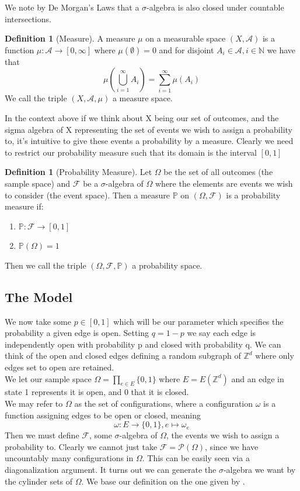\documentclass[a4paper,11pt]{article}
\theoremstyle{definition}
\newtheorem{definition}[theorem]{Definition}
\newcommand{\ints}{\mathbb{Z}}
\newcommand{\sigalg}{$\sigma$-algebra }
\begin{document}
We note by De Morgan's Laws that a $\sigma$-algebra is also closed under countable intersections.

\begin{definition}[Measure]
	A measure $\mu$ on a measurable space $(X,\mathcal{A})$ is a function $\mu: \mathcal{A} \rightarrow [0,\infty]$ where 
	$\mu(\emptyset) = 0 $ and for disjoint $A_i \in \mathcal{A}, i \in \mathbb{N}$ we have that
	$$ \mu(\bigcup^\infty_{i=1} A_i) = \sum_{i = 1}^{\infty} \mu(A_i)  $$
	We call the triple $(X,\mathcal{A},\mu)$ a measure space.
\end{definition}

In the context above if we think about X being our set of outcomes, and the sigma algebra of X representing the set of events we wish to assign a probability to, it's intuitive to give these events a probability by a measure. 
Clearly we need to restrict our probability measure such that its domain is the interval $[0,1]$ 

\begin{definition}[Probability Measure]
	Let $\Omega$ be the set of all outcomes (the sample space) and $\mathcal{F}$ be a \sigalg of $\Omega$ where the elements are events we wish to consider (the event space). Then a measure $\mathbb{P}$ on $(\Omega,\mathcal{F})$ is a probability measure if:
	\begin{enumerate}
		\item $\mathbb{P}: \mathcal{F} \rightarrow [0,1]$
		\item $\mathbb{P}(\Omega) = 1$
	\end{enumerate}
	Then we call the triple $(\Omega,\mathcal{F},\mathbb{P})$ a probability space.
	
\end{definition}

\subsection{The Model}

We now take some $p \in [0,1]$ which will be our parameter which specifies the probability a given edge is open. 
Setting $q = 1-p$ we say each edge is independently open with probability p and closed with probability q.
We can think of the open and closed edges defining a random subgraph of $\ints^d$ where only edges set to open are retained.\\

We let our sample space $\Omega = \prod_{e \in E} \{0,1\}$ where $E = E(\ints^d)$ and an edge in state 1 represents it is open, and 0 that it is closed.\\
We may refer to $\Omega$ as the set of configurations, where a configuration $\omega$ is a function assigning edges to be open or closed, meaning 
$$\omega:E \to \{0,1\}, e \mapsto \omega_e$$
Then we must define $\mathcal{F}$, some \sigalg of $\Omega$, the events we wish to assign a probability to. 
Clearly we cannot just take $\mathcal{F} = \mathcal{P}(\Omega)$, since we have uncountably many configurations in $\Omega$. 
This can be easily seen via a diagonalization argument. 
It turns out we can generate the \sigalg we want by the cylinder sets of $\Omega$. We base our definition on the one given by \cite{bollo2006}.
\end{document}
